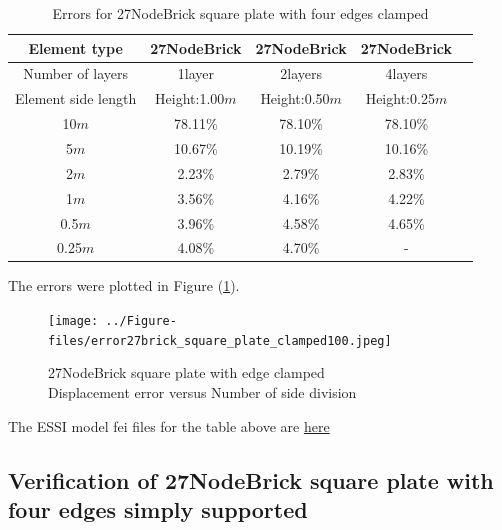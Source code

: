 \documentclass[fleqn,11pt]{article}
\begin{document}
\begin{table}[H]
  \centering
  \caption{Errors for 27NodeBrick square plate with four edges clamped}
  \label{table Errors for 27NodeBrick square plate with four edges clamped}
\begin{tabular}{|c|c|c|c|c|}
\hline
Element type     & 27NodeBrick     & 27NodeBrick     & 27NodeBrick      \\ \hline
Number of layers & 1layer         & 2layers         & 4layers          \\ \hline
Element side length & Height:1.00$m$ & Height:0.50$m$ & Height:0.25$m$  \\ \hline
10$m$            & 78.11\% & 78.10\% & 78.10\%       \\ \hline
5$m$             & 10.67\% & 10.19\% & 10.16\%       \\ \hline
2$m$             & 2.23\%  & 2.79\%  & 2.83\%        \\ \hline
1$m$             & 3.56\%  & 4.16\%  & 4.22\%        \\ \hline
0.5$m$           & 3.96\%  & 4.58\%  & 4.65\%        \\ \hline
0.25$m$          & 4.08\%  & 4.70\%  &    -         \\
\hline
\end{tabular}
\end{table}

The errors were plotted in Figure (\ref{fig 27NodeBrick square plate with edge clamped}).

\begin{figure}[H]
  \centering
  \texttt{[image: ../Figure-files/error27brick\_square\_plate\_clamped100.jpeg]}
  \captionsetup{justification=centering,margin=3cm}
  \caption{27NodeBrick square plate with edge clamped\\
      Displacement error   versus   Number of side division}
  \label{fig 27NodeBrick square plate with edge clamped}
\end{figure}

The ESSI model fei files for the table above are \href{https://github.com/yuan-energy/ESSI_Verification/blob/master/27NodeBrick/square_plate_clamped/square_plate_clamped.tar.gz?raw=true}{here}



\newpage
\subsection{Verification of 27NodeBrick square plate with four edges simply supported}
\end{document}
